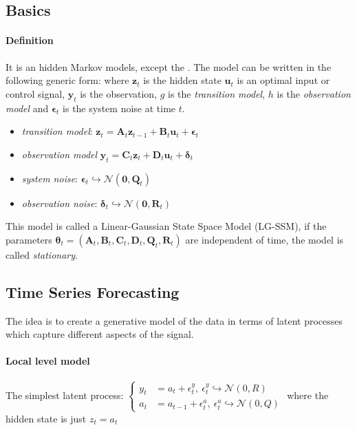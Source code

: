 \subsection{Basics}
\paragraph{Definition}
It is an hidden Markov models, except the .
The model can be written in the following generic form: 
where $\bm{z}_{t}$ is the hidden state $\bm{u}_{t}$ is an optimal input or control signal, $\bm{y}_{
t}$ is the observation, $g$ is the \emph{transition model}, $h$ is the \emph{observation model} and 
$\bm{
\epsilon}_{t}$ is the system noise at time $t$.
\begin{itemize}
    \item \emph{transition model}: $\bm{z}_{t} = \bm{A}_{t}\bm{z}_{t-1} + \bm{B}_{t}\bm{u}_{t} +
        \bm{\epsilon}_{t}$
    \item \emph{observation model} $\bm{y}_{t} = \bm{C}_{t}\bm{z}_{t} + \bm{D}_{t}\bm{u}_{t} + \bm{
        \delta}_{t}$
    \item \emph{system noise}: $\bm{\epsilon}_{t}\hookrightarrow \mathcal{N}(\bm{0}, \bm{Q}_{t})$
    \item \emph{observation noise}: $\bm{\delta}_{t}\hookrightarrow \mathcal{N}(\bm{0}, \bm{R}_{t})$
\end{itemize}
This model is called a Linear-Gaussian State Space Model (LG-SSM), if the parameters $\bm{\theta}_{t}
= (\bm{A}_{t},\bm{B}_{t},\bm{C}_{t},\bm{D}_{t},\bm{Q}_{t},\bm{R}_{t})$ are independent of time, the
model is called \emph{stationary}.

\subsection{Time Series Forecasting}
The idea is to create a generative model of the data in terms of latent processes which capture 
different aspects of the signal.

\paragraph{Local level model}
The simplest latent process:
$\begin{cases}
    y_{t} &= a_{t} + \epsilon^{y}_{t},~\epsilon^{y}_{t}\hookrightarrow \mathcal{N}(0, R)\\
    a_{t} &= a_{t-1} + \epsilon^{a}_{t},~\epsilon^{a}_{t}\hookrightarrow \mathcal{N}(0, Q)
\end{cases}$
where the hidden state is just $z_{t}=a_{t}$
